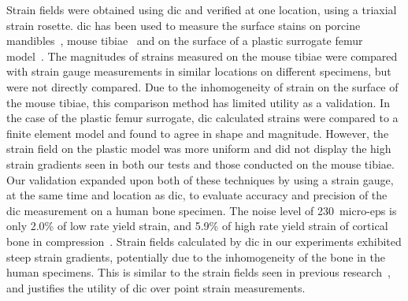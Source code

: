 Strain fields were obtained using \ac{dic} and verified at one location, using a triaxial strain rosette.
\ac{dic} has been used to measure the surface stains on porcine mandibles~\citep{yasuyuki_relationship_2009}, mouse tibiae~\citep{sztefek_using_2010} and on the surface of a plastic surrogate femur model~\citep{dickinson_experimental_2011}.
The magnitudes of strains measured on the mouse tibiae were compared with strain gauge measurements in similar locations on different specimens, but were not directly compared.
Due to the inhomogeneity of strain on the surface of the mouse tibiae, this comparison method has limited utility as a validation.
In the case of the plastic femur surrogate, \ac{dic} calculated strains were compared to a finite element model and found to agree in shape and magnitude.
However, the strain field on the plastic model was more uniform and did not display the high strain gradients seen in both our tests and those conducted on the mouse tibiae.
Our validation expanded upon both of these techniques by using a strain gauge, at the same time and location as \ac{dic}, to evaluate accuracy and precision of the \ac{dic} measurement on a human bone specimen.
The noise level of 230~\ac{micro-eps} is only 2.0\% of low rate yield strain, and 5.9\% of high rate yield strain of cortical bone in compression~\citep{hansen_effect_2008}.
Strain fields calculated by \ac{dic} in our experiments exhibited steep strain gradients, potentially due to the inhomogeneity of the bone in the human specimens.
This is similar to the strain fields seen in previous research~\citep{sztefek_using_2010}, and justifies the utility of \ac{dic} over point strain measurements.

